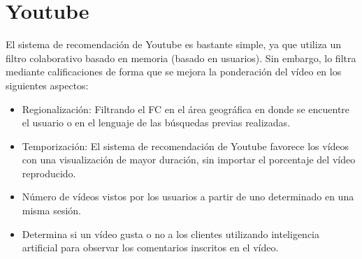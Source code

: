 \section{Youtube}
El sistema de recomendación de Youtube es bastante simple, ya que utiliza un filtro colaborativo basado en memoria (basado en usuarios). Sin embargo, lo filtra mediante calificaciones de forma que se mejora la ponderación del vídeo en los siguientes aspectos: 
\begin{itemize}
\item Regionalización: Filtrando el FC en el área geográfica en donde se encuentre el usuario o  en  el lenguaje de las búsquedas previas realizadas. \nocite{md:youtube}
\item Temporización: El sistema de recomendación de Youtube favorece los vídeos con una visualización de mayor duración, sin importar el porcentaje del vídeo reproducido. \nocite{anali:youtube}
\item Número de vídeos vistos por los usuarios a partir de uno determinado en una misma sesión. \nocite{hoots:youtube}
\item Determina si un vídeo gusta o no a los clientes utilizando inteligencia artificial para observar los comentarios inscritos en el vídeo. 
\end{itemize}
